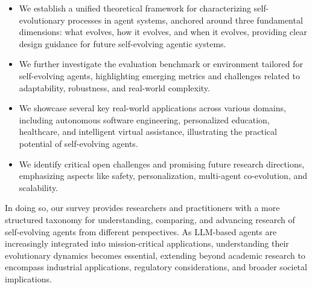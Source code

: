 \documentclass[10pt]{article} %
\begin{document}
\begin{itemize}
    \item We establish a unified theoretical framework for characterizing self-evolutionary processes in agent systems, anchored around three fundamental dimensions: what evolves, how it evolves, and when it evolves, providing clear design guidance for future self-evolving agentic systems.

    \item We further investigate the evaluation benchmark or environment tailored for self-evolving agents, highlighting emerging metrics and challenges related to adaptability, robustness, and real-world complexity.

    \item We showcase several key real-world applications across various domains, including autonomous software engineering, personalized education, healthcare, and intelligent virtual assistance, illustrating the practical potential of self-evolving agents.

    \item We identify critical open challenges and promising future research directions, emphasizing aspects like safety, personalization, multi-agent co-evolution, and scalability.


\end{itemize}

In doing so, our survey provides researchers and practitioners with a more structured taxonomy for understanding, comparing, and advancing research of self-evolving agents from different perspectives. As LLM-based agents are increasingly integrated into mission-critical applications, understanding their evolutionary dynamics becomes essential, extending beyond academic research to encompass industrial applications, regulatory considerations, and broader societal implications.
\end{document}
